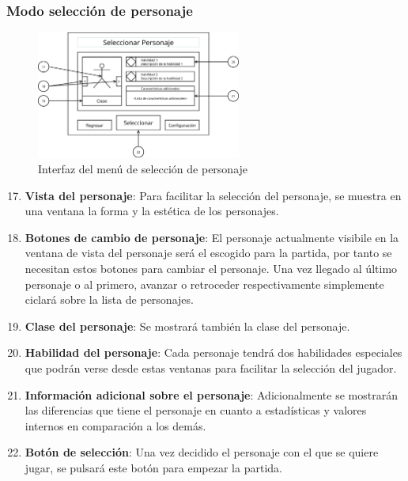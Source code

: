 \subsubsection{Modo selección de personaje}
\begin{figure}[H]
    \centering
    \includegraphics[width=0.6\textwidth]{5-Cuerpo/Chapter5/5.5/I5.png} %
    \caption{Interfaz del menú de selección de personaje}
    \label{fig:Interface_Seleccion_Personaje}
\end{figure}
\begin{enumerate}\setcounter{enumi}{16}
    \item \textbf{Vista del personaje}: Para facilitar la selección del
    personaje, se muestra en una ventana la forma y la estética de los
    personajes.
    \item \textbf{Botones de cambio de personaje}: El personaje actualmente
    visibile en la ventana de vista del personaje será el escogido para la
    partida, por tanto se necesitan estos botones para cambiar el personaje. Una
    vez llegado al último personaje o al primero, avanzar o retroceder
    respectivamente simplemente ciclará sobre la lista de personajes.
    \item \textbf{Clase del personaje}: Se mostrará también la clase del
    personaje.
    \item \textbf{Habilidad del personaje}: Cada personaje tendrá dos
    habilidades especiales que podrán verse desde estas ventanas para facilitar
    la selección del jugador.
    \item \textbf{Información adicional sobre el personaje}: Adicionalmente se
    mostrarán las diferencias que tiene el personaje en cuanto a estadísticas y
    valores internos en comparación a los demás.
    \item \textbf{Botón de selección}: Una vez decidido el personaje con el que
    se quiere jugar, se pulsará este botón para empezar la partida.
\end{enumerate}

